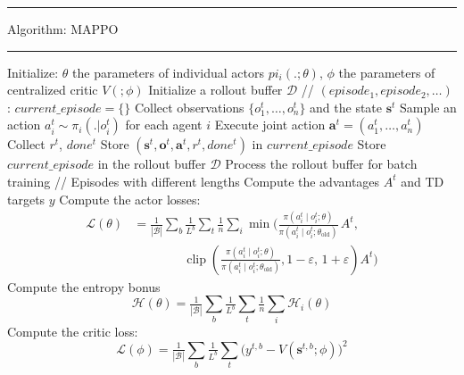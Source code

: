 \documentclass[varwidth, border=20pt]{standalone}
\begin{document}
\begingroup
\small                    
\begin{center}
  \begin{minipage}{0.99\linewidth} 
    \hrule height 0.7pt
    \vspace{3pt}
    Algorithm: MAPPO
    \vspace{3pt}
    \hrule height 0.7pt
    \vspace{6pt}

   
    \begin{algorithmic}[1]
      \State Initialize: $\theta$ the parameters of individual actors $pi_i(.;\theta)$, $\phi$ the parameters of centralized critic $V(;\phi)$
        \State Initialize a rollout buffer $\mathcal{D}$ // $(episode_1, episode_2, \dots)$
        :
            \State $current\_episode = \{ \}$ 
                \State Collect observations $\{o^t_1,\dots,o^t_n\}$ and the state $\mathbf{s}^t$
                \State  Sample an action $a_i^t \sim \pi_i(.|o_i^t)$ for each agent $i$
                \State Execute joint action $\mathbf{a}^t = (a_1^t,\dots,a_n^t)$
                \State Collect $r^t$, $done^t$
                \State Store $(\mathbf{s}^t,\mathbf{o}^t,\mathbf{a}^t,r^t,done^t)$ in $current\_episode$
                \EndWhile
            \State Store $current\_episode$ in the rollout buffer $\mathcal{D}$
        \EndFor
        \State Process the rollout buffer for batch training // Episodes with different lengths
        \State Compute the advantages $A^t$ and TD targets $y$
        \State Compute the actor losses:
        \begin{align*}
            \mathcal{L}(\theta)
                &= \tfrac{1}{|\mathcal{B}|}\sum_b \tfrac{1}{L^b} \sum_t \tfrac{1}{n} \sum_i 
                    \min\!\Bigg(
                        \frac{\pi(a_i^t \mid o_i^t;\theta)}{\pi(a_i^t \mid o_i^t;\theta_{\text{old}})}\, A^t, \\
                &\qquad\qquad
                        \operatorname{clip}\!\left(
                            \frac{\pi(a_i^t \mid o_i^t;\theta)}{\pi(a_i^t \mid o_i^t;\theta_{\text{old}})},
                            1-\varepsilon,\,1+\varepsilon
                        \right) A^t
                    \Bigg)
            \end{align*}
        \State Compute the entropy bonus
        \Statex
        \[
            \mathcal{H}(\theta) =   \tfrac{1}{|\mathcal{B}|}\sum_b \tfrac{1}{L^b} \sum_t \tfrac{1}{n} \sum_i \mathcal{H}_i(\theta)
        \]
        \State Compute the critic loss: 
        \Statex
          \[
            \mathcal{L}(\phi)=\tfrac{1}{|\mathcal{B}|}\sum_b \tfrac{1}{L^b} \sum_t \Big(y^{t,b} -  V(\mathbf{s}^{t,b}; \phi)\Big)^2
          \]


\end{algorithmic}
\end{minipage}
\end{center}
\end{document}

